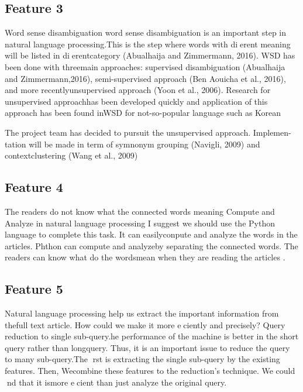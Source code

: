\documentclass[a4paper]{article} %
\begin{document}
\subsection*{Feature 3 }
\label{task1:feature3}
Word sense disambiguation
word sense disambiguation is an important step in natural language processing.This is the step where words with dierent meaning will be listed in dierentcategory (Abualhaija and Zimmermann, 2016).  WSD has been done with threemain  approaches:   supervised  disambiguation  (Abualhaija  and  Zimmermann,2016), semi-supervised approach (Ben Aouicha et al., 2016), and more recentlyunsupervised approach (Yoon et al., 2006).  Research for unsupervised approachhas been developed quickly and application of this approach has been found inWSD for not-so-popular language such as Korean

The project team has decided to pursuit the unsupervised approach.  Implemen-tation will be made in term of symnonym grouping (Navigli, 2009) and contextclustering (Wang et al., 2009)


\subsection*{Feature 4 }
\label{task1:feature4}
The readers do not know what the connected words meaning
Compute and Analyze in natural language processing
I suggest we should use the Python language to complete this task.  It can easilyconpute and analyze the words in the articles.  Phthon can compute and analyzeby separating the connected words.  The readers can know what do the wordsmean when they are reading the articles .


\subsection*{Feature 5 }
\label{task1:feature5}
Natural language processing help us extract the important information from thefull text article.  How could we make it more eciently and precisely?
Query reduction to single sub-query.he performance of the machine is better in the short query rather than longquery.  Thus, it is an important issue to reduce the query to many sub-query.The rst is extracting the single sub-query by the existing features.  Then, Wecombine these features to the reduction's technique.  We could nd that it ismore ecient than just analyze the original query.



\end{document}
